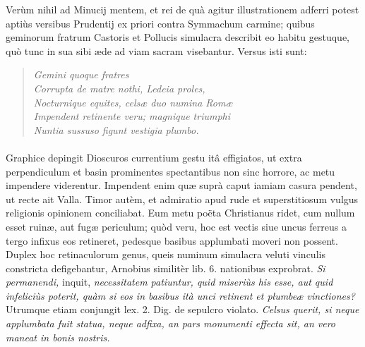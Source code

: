 \documentclass[a4paper, 11pt, oneside, polutonikogreek, latin]{article}
\begin{document}
Verùm nihil ad Minucij mentem, et rei de quà agitur illustrationem adferri potest aptiùs versibus Prudentij ex priori contra Symmachum carmine; quibus geminorum fratrum Castoris et Pollucis simulacra describit eo habitu gestuque, quò tunc in sua sibi æde ad viam sacram visebantur. Versus isti sunt:
\begin{quote}
\hspace*{15mm}\emph{Gemini quoque fratres}\\
\emph{Corrupta de matre nothi, Ledeia proles,}\\
\emph{Nocturnique equites, celsæ duo numina Romæ}\\
\emph{Impendent retinente veru; magnique triumphi}\\
\emph{Nuntia sussuso figunt vestigia plumbo.}\\
\end{quote}
\paragraph{}
Graphice depingit Dioscuros currentium gestu itâ effigiatos, ut extra perpendiculum et basin prominentes spectantibus non sinc horrore, ac metu impendere viderentur. Impendent enim quæ suprà caput iamiam casura pendent, ut recte ait Valla. Timor autèm, et admiratio apud rude et superstitiosum vulgus religionis opinionem conciliabat. Eum metu poëta Christianus ridet, cum nullum esset ruinæ, aut fugæ periculum; quòd veru, hoc est vectis siue uncus ferreus a tergo infixus eos retineret, pedesque basibus applumbati moveri non possent. Duplex hoc retinaculorum genus, queis numinum simulacra veluti vinculis constricta defigebantur, Arnobius similitèr lib. 6. nationibus exprobrat. \emph{Si permanendi,} inquit, \emph{necessitatem patiuntur, quid miseriùs his esse, aut quid infeliciùs poterit, quàm si eos in basibus ità unci retinent et plumbeæ vinctiones?} Utrumque etiam conjungit lex. 2. Dig. de sepulcro violato. \emph{Celsus querit, si neque applumbata fuit statua, neque adfixa, an pars monumenti effecta sit, an vero maneat in bonis nostris.}
\end{document}

